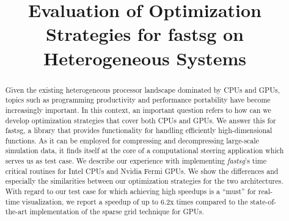 \documentclass[10pt, conference]{IEEEtran}
\begin{document}
\title{Evaluation of Optimization Strategies for fastsg on Heterogeneous Systems}
\author{
\and
{}
}

\maketitle

\begin{abstract}
Given the existing heterogeneous processor landscape dominated by CPUs and GPUs,
topics such as programming productivity and performance portability have become
increasingly important. In this context, an important question refers to how can
we develop optimization strategies that cover both CPUs and GPUs. We answer this
for fastsg, a library that provides functionality for handling efficiently
high-dimensional functions. As it can be employed for compressing and
decompressing large-scale simulation data, it finds itself at the core of a
computational steering application which serves us as test case. We describe our
experience with implementing \textit{fastsg}'s time critical routines for Intel
CPUs and Nvidia Fermi GPUs. We show the differences and especially the similarities
between our optimization strategies for the two architectures. With regard to
our test case for which achieving high speedups is a ``must'' for real-time
visualization, we report a speedup of up to 6.2x times compared to the
state-of-the-art implementation of the sparse grid technique for GPUs.
\end{abstract}



\end{document}
